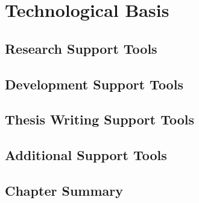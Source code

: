 \chapter[Technological Basis]{Technological Basis}

\section{Research Support Tools}


\section{Development Support Tools}


\section{Thesis Writing Support Tools}


\section{Additional Support Tools}


\section{Chapter Summary}

